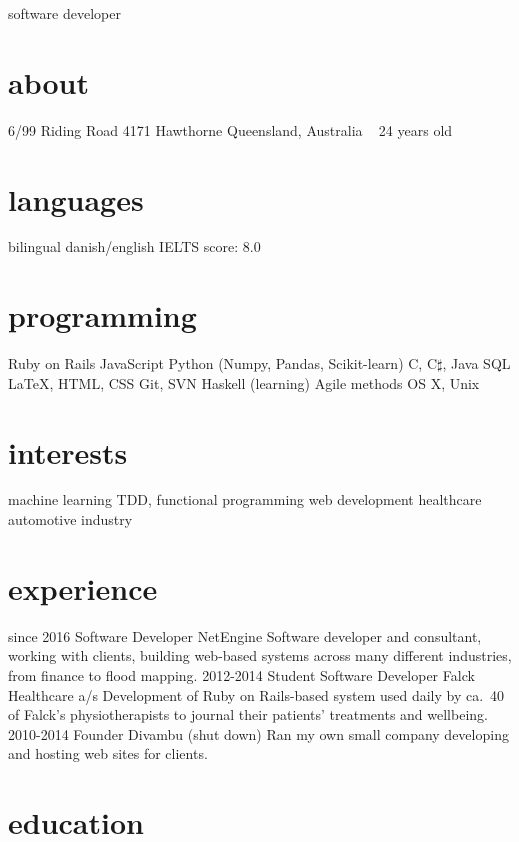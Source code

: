 \documentclass{afriggeri-cv/friggeri-cv}
\begin{document}
       {software developer}

\begin{aside}
  \section{about}
    6/99 Riding Road
    4171 Hawthorne
    Queensland, Australia
    ~
    24 years old
  \section{languages}
    bilingual danish/english
    IELTS score: 8.0
  \section{programming}
    Ruby on Rails
    JavaScript
    Python (Numpy, Pandas, Scikit-learn)
    C, C$\sharp$, Java
    SQL
    \LaTeX, HTML, CSS
    Git, SVN
    Haskell (learning)
    Agile methods
    OS X, Unix
  \section{interests}
    machine learning
    TDD, functional programming
    web development
    healthcare
    automotive industry
\end{aside}

\section{experience}

\begin{entrylist}
  \entry%
    {since 2016}
    {Software Developer}
    {NetEngine}
    {Software developer and consultant, working with clients, building web-based systems across many
    different industries, from finance to flood mapping.}
  \entry%
    {2012-2014}
    {Student Software Developer}
    {Falck Healthcare a/s}
    {Development of Ruby on Rails-based system used daily by ca.\ 40 of Falck's physiotherapists to journal their patients' treatments and wellbeing.}
  \entry
    {2010-2014}
    {Founder}
    {Divambu (shut down)}
    {Ran my own small company developing and hosting web sites for clients.}
\end{entrylist}

\section{education}
\end{document}
